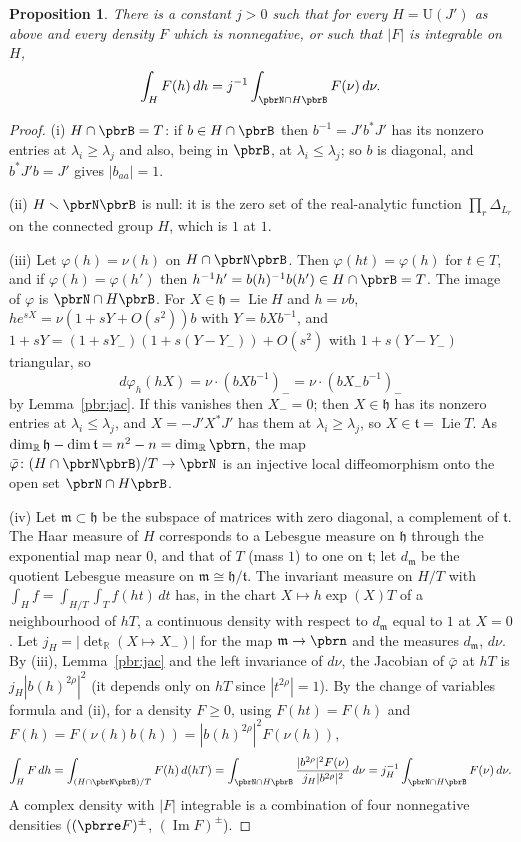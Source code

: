 \documentclass[10pt]{amsart}
\newtheorem{proposition}[theorem]{Proposition}
\theoremstyle{definition}
\theoremstyle{remark}
\newcommand{\R}{\mathbb R}
\providecommand{\auU}{\mathrm U}
\begin{document}
\begin{proposition}\label{pbr:flag}
There is a constant $j>0$ such that for every $H=\auU(J')$ as above and every density $F$ which is
nonnegative, or such that $|F|$ is integrable on $H$,
\[
\int_HF(h)\,dh=j^{-1}\int_{\pbrN\cap H\pbrB}F(\nu)\,d\nu .
\]
\end{proposition}
\begin{proof}
(i) $H\cap\pbrB=T$: if $b\in H\cap\pbrB$ then $b^{-1}=J'b^*J'$ has its nonzero entries at
$\lambda_i\ge\lambda_j$ and also, being in $\pbrB$, at $\lambda_i\le\lambda_j$; so $b$ is diagonal,
and $b^*J'b=J'$ gives $|b_{aa}|=1$.

(ii) $H\smallsetminus\pbrN\pbrB$ is null: it is the zero set of the real-analytic function
$\prod_r\Delta_{L_r}$ on the connected group $H$, which is $1$ at $1$.

(iii) Let $\varphi(h)=\nu(h)$ on $H\cap\pbrN\pbrB$. Then $\varphi(ht)=\varphi(h)$ for $t\in T$, and if
$\varphi(h)=\varphi(h')$ then $h^{-1}h'=b(h)^{-1}b(h')\in H\cap\pbrB=T$. The image of $\varphi$ is
$\pbrN\cap H\pbrB$. For $X\in\mathfrak h=\operatorname{Lie}H$ and $h=\nu b$, $he^{sX}=\nu(1+sY+O(s^2))
b$ with $Y=bXb^{-1}$, and $1+sY=(1+sY_-)(1+s(Y-Y_-))+O(s^2)$ with $1+s(Y-Y_-)$ triangular, so
\[
d\varphi_h(hX)=\nu\cdot(bXb^{-1})_-=\nu\cdot(bX_-b^{-1})_-
\]
by Lemma~\ref{pbr:jac}. If this vanishes then $X_-=0$; then $X\in\mathfrak h$ has its nonzero entries
at $\lambda_i\le\lambda_j$, and $X=-J'X^*J'$ has them at $\lambda_i\ge\lambda_j$, so $X\in
\mathfrak t=\operatorname{Lie}T$. As $\dim_\R\mathfrak h-\dim\mathfrak t=n^2-n=\dim_\R\pbrn$, the map
$\bar\varphi\colon(H\cap\pbrN\pbrB)/T\to\pbrN$ is an injective local diffeomorphism onto the open set
$\pbrN\cap H\pbrB$.

(iv) Let $\mathfrak m\subset\mathfrak h$ be the subspace of matrices with zero diagonal, a complement
of $\mathfrak t$. The Haar measure of $H$ corresponds to a Lebesgue measure on $\mathfrak h$ through
the exponential map near $0$, and that of $T$ (mass $1$) to one on $\mathfrak t$; let $d_{\mathfrak m}$
be the quotient Lebesgue measure on $\mathfrak m\cong\mathfrak h/\mathfrak t$. The invariant measure
on $H/T$ with $\int_Hf=\int_{H/T}\int_Tf(ht)\,dt$ has, in the chart $X\mapsto h\exp(X)T$ of a
neighbourhood of $hT$, a continuous density with respect to $d_{\mathfrak m}$ equal to $1$ at $X=0$.
Let $j_H=|\det_\R(X\mapsto X_-)|$ for the map $\mathfrak m\to\pbrn$ and the measures
$d_{\mathfrak m}$, $d\nu$. By (iii), Lemma~\ref{pbr:jac} and the left invariance of $d\nu$, the
Jacobian of $\bar\varphi$ at $hT$ is $j_H|b(h)^{2\rho}|^2$ (it depends only on $hT$ since
$|t^{2\rho}|=1$). By the change of variables formula and (ii), for a density $F\ge0$, using
$F(ht)=F(h)$ and $F(h)=F(\nu(h)b(h))=|b(h)^{2\rho}|^2F(\nu(h))$,
\[
\int_HF\,dh=\int_{(H\cap\pbrN\pbrB)/T}F(h)\,d(hT)=\int_{\pbrN\cap H\pbrB}\frac{|b^{2\rho}|^2F(\nu)}
{j_H|b^{2\rho}|^2}\,d\nu=j_H^{-1}\int_{\pbrN\cap H\pbrB}F(\nu)\,d\nu .
\]
A complex density with $|F|$ integrable is a combination of four nonnegative densities
($(\pbrre F)^\pm$, $(\operatorname{Im}F)^\pm$).


\end{proof}
\end{document}
